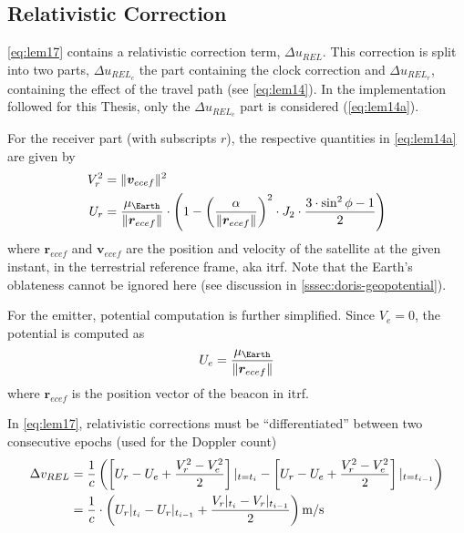 \subsection{Relativistic Correction}\label{ssec:relativistic-correction}
\autoref{eq:lem17} contains a relativistic correction term, $\Delta u_{REL}$. This 
correction is split into two parts, $\Delta u_{REL_c}$ the part containing the 
clock correction and $\Delta u_{REL_r}$, containing the effect of the travel 
path (see \autoref{eq:lem14}). In the implementation followed for this Thesis, 
only the $\Delta u_{REL_c}$ part is considered (\autoref{eq:lem14a}).

For the receiver part (with subscripts $r$), the respective quantities in 
\autoref{eq:lem14a} are given by
\begin{equation}
  \begin{aligned}
    V^2_r &= \norm{\bm{v}_{ecef}}^2 \\
    U_r   &= \frac{\mu _{\Earth}}{\norm{\bm{r}_{ecef}}} \cdot \left( 1 - 
      \left(\frac{\alpha}{\norm{\bm{r}_{ecef}}}\right) ^2 \cdot J_2 \cdot
        \frac{3 \cdot \sin ^2{\phi} -1}{2} \right)
  \end{aligned}
  \label{eq:potential-receiver}
\end{equation}
where $\bm{r}_{ecef}$ and $\bm{v}_{ecef}$ are the position and velocity of the 
satellite at the given instant, in the terrestrial reference frame, 
aka \gls{itrf}. Note that the Earth's oblateness cannot be ignored here (see 
discussion in \autoref{sssec:doris-geopotential}).

For the emitter, potential computation is further simplified. Since $V_e = 0$, 
the potential is computed as 
\begin{equation}
  U_e = \frac{\mu _{\Earth}}{\norm{\bm{r}_{ecef}}}
  \label{eq:potential-emitter}
\end{equation}
where $\bm{r}_{ecef}$ is the position vector of the beacon in \gls{itrf}.

In \autoref{eq:lem17}, relativistic corrections must be ``differentiated'' between 
two consecutive epochs (used for the Doppler count)
\begin{equation}\label{eq:drel-diff}
  \begin{aligned}
    \Delta v_{REL} &= \frac{1}{c} 
      \left( 
        \left[ U_r - U_e + \frac{V^2_r - V^2_e}{2} \right]\at{t=t_i} 
        - \left[ U_r - U_e + \frac{V^2_r - V^2_e}{2} \right]\at{t=t_{i-1}} 
      \right) \\
      &= \frac{1}{c} \cdot \left( 
        U_r\at{t_i} - U_r\at{t_{i-1}} +  \frac{V_r\at{t_i}-V_r\at{t_{i-1}}}{2} 
        \right) \si{\m\per\s}
  \end{aligned}
\end{equation}


